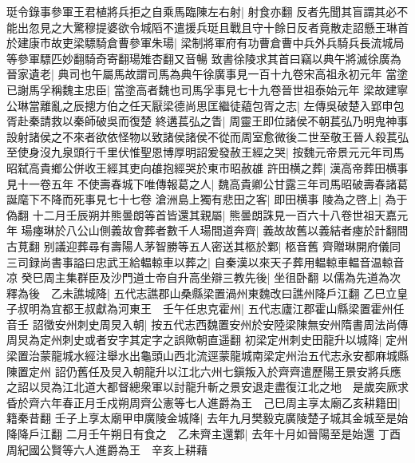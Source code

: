 珽令錄事參軍王君植將兵拒之自乘馬臨陳左右射|{
	射食亦翻}
反者先聞其盲謂其必不能出忽見之大驚穆提婆欲令城䧟不遣援兵珽且戰且守十餘日反者竟散走詔懸王琳首於建康市故吏梁驃騎倉曹參軍朱瑒|{
	梁制將軍府有功曹倉曹中兵外兵騎兵長流城局等參軍驃匹妙翻騎奇寄翻瑒雉杏翻又音暢}
致書徐陵求其首曰竊以典午將滅徐廣為晉家遺老|{
	典司也午屬馬故謂司馬為典午徐廣事見一百十九卷宋高祖永初元年}
當塗已謝馬孚稱魏主忠臣|{
	當塗高者魏也司馬孚事見七十九卷晉世祖泰始元年}
梁故建寧公琳當離亂之辰摠方伯之任天厭梁德尚思匡繼徒藴包胥之志|{
	左傳吳破楚入郢申包胥赴秦請救以秦師破吳而復楚}
終遘萇弘之眚|{
	周靈王即位諸侯不朝萇弘乃明鬼神事設射諸侯之不來者欲依怪物以致諸侯諸侯不從而周室愈微後二世至敬王晉人殺萇弘}
至使身沒九泉頭行千里伏惟聖恩博厚明詔爰發赦王經之哭|{
	按魏元帝景元元年司馬昭弑高貴鄉公併收王經其吏向䧺抱經哭於東市昭赦䧺}
許田横之葬|{
	漢高帝葬田横事見十一卷五年}
不使壽春城下唯傳報葛之人|{
	魏高貴卿公甘露三年司馬昭破壽春諸葛誕麾下不降而死事見七十七卷}
滄洲島上獨有悲田之客|{
	即田横事}
陵為之啓上|{
	為于偽翻}
十二月壬辰朔并熊曇朗等首皆還其親屬|{
	熊曇朗誅見一百六十八卷世祖天嘉元年}
瑒瘞琳於八公山側義故會葬者數千人瑒間道奔齊|{
	義故故舊以義結者瘞於計翻間古莧翻}
别議迎葬尋有壽陽人茅智勝等五人密送其柩於鄴|{
	柩音舊}
齊贈琳開府儀同三司録尚書事謚曰忠武王給輼輬車以葬之|{
	自秦漢以來天子葬用輼輬車輼音温輬音凉}
癸巳周主集群臣及沙門道士帝自升高坐辯三教先後|{
	坐徂卧翻}
以儒為先道為次釋為後　乙未譙城降|{
	五代志譙郡山桑縣梁置渦州東魏改曰譙州降戶江翻}
乙巳立皇子叔明為宜都王叔獻為河東王　壬午任忠克霍州|{
	五代志廬江郡霍山縣梁置霍州任音壬}
詔徵安州刺史周炅入朝|{
	按五代志西魏置安州於安陸梁陳無安州隋書周法尚傳周炅為定州刺史或者安字其定字之誤歟朝直遥翻}
初梁定州刺史田龍升以城降|{
	定州梁置治蒙龍城水經注舉水出龜頭山西北流逕蒙龍城南梁定州治五代志永安都麻城縣陳置定州}
詔仍舊任及炅入朝龍升以江北六州七鎭叛入於齊齊遣歷陽王景安將兵應之詔以炅為江北道大都督總衆軍以討龍升斬之景安退走盡復江北之地　是歲突厥求昏於齊六年春正月壬戍朔周齊公憲等七人進爵為王　己巳周主享太廟乙亥耕籍田|{
	籍秦昔翻}
壬子上享太廟甲申廣陵金城降|{
	去年九月樊毅克廣陵楚子城其金城至是始降降戶江翻}
二月壬午朔日有食之　乙未齊主還鄴|{
	去年十月如晉陽至是始還}
丁酉周紀國公賢等六人進爵為王　辛亥上耕藉

